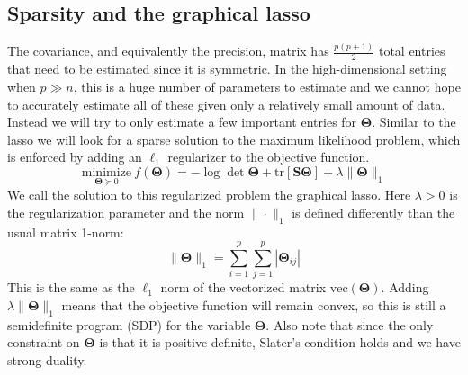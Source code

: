 \documentclass[10pt, letterpaper]{article}
\newcommand{\preci}{\boldsymbol \Theta}
\newcommand{\tr}[1]{\mathrm{tr}\left[  #1 \right]}
\newcommand{\sampcov}{\boldsymbol S} %
\begin{document}
\subsection{Sparsity and the graphical lasso}

The covariance, and equivalently the precision, matrix has $\frac{p(p+1)}{2}$ total entries that need to be estimated since it is symmetric.  In the high-dimensional setting when $p \gg n$, this is a huge number of parameters to estimate and we cannot hope to accurately estimate all of these given only a relatively small amount of data.  Instead we will try to only estimate a few important entries for $\preci$.  Similar to the lasso we will look for a sparse solution to the maximum likelihood problem, which is enforced by adding an $\ell_1$ regularizer to the objective function.
\begin{equation}
\underset{\preci \succeq 0}{\mathrm{minimize}}\  f(\preci) = - \log \det \preci + \tr{\sampcov \preci} + \lambda \|\preci\|_1
\label{eq:glasso_primal}
\end{equation}
We call the solution to this regularized problem the graphical lasso.  Here $\lambda > 0$ is the regularization parameter and the norm $\|\cdot \|_1$ is defined differently than the usual matrix 1-norm:
\[
\|\preci \|_1 = \sum_{i=1}^p \sum_{j=1}^p |\preci_{ij}|
\]
This is the same as the $\ell_1$ norm of the vectorized matrix $\mathrm{vec}\left( \preci \right)$.  Adding $\lambda \|\preci\|_1$ means that the objective function will remain convex, so this is still a semidefinite program (SDP) for the variable $\preci$.  Also note that since the only constraint on $\preci$ is that it is positive definite, Slater's condition holds and we have strong duality.\\
\end{document}
